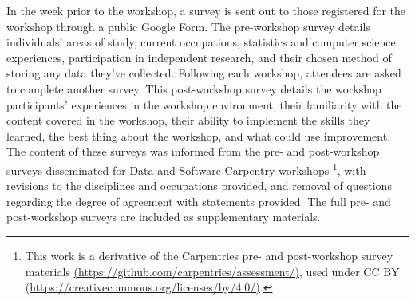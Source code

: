 \documentclass[12pt]{article}
\begin{document}
\quad  In the week prior to the workshop, a survey is sent out to those registered for the workshop through a public Google Form. The pre-workshop survey details individuals' areas of study, current occupations, statistics and computer science experiences, participation in independent research, and their chosen method of storing any data they've collected. Following each workshop, attendees are asked to complete another survey. This post-workshop survey details the workshop participants' experiences in the workshop environment, their familiarity with the content covered in the workshop, their ability to implement the skills they learned, the best thing about the workshop, and what could use improvement. The content of these surveys was informed from the pre- and post-workshop surveys disseminated for Data and Software Carpentry workshops \footnote{This work is a derivative of the Carpentries pre- and post-workshop survey materials \href{https://github.com/carpentries/assessment/}{(https://github.com/carpentries/assessment/)}, used under CC BY \href{https://creativecommons.org/licenses/by/4.0/}{(https://creativecommons.org/licenses/by/4.0/)}.}, with revisions to the disciplines and occupations provided, and removal of questions regarding the degree of agreement with statements provided. The full pre- and post-workshop surveys are included as supplementary materials.

% 
% 
\end{document}
